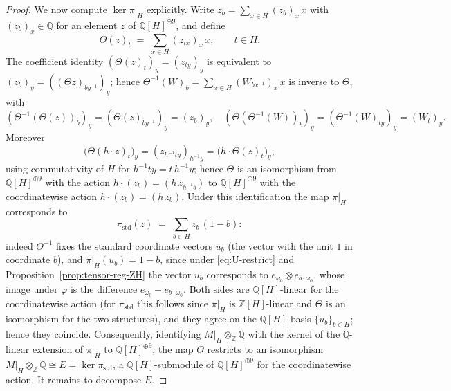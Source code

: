 \documentclass[12pt,a4paper]{article}
\theoremstyle{definition}
\begin{document}
\begin{proof}
We now compute \(\ker \pi|_H\) explicitly.  Write \(z_b = \sum_{x \in H}
(z_b)_x\, x\) with \((z_b)_x \in \mathbb{Q}\) for an element \(z\) of
\(\mathbb{Q}[H]^{\oplus 9}\), and define
\[
\Theta(z)_t \;=\; \sum_{x \in H} (z_{t x})_x\, x , \qquad t \in H .
\]
The coefficient identity \((\Theta(z)_t)_y = (z_{t y})_y\) is
equivalent to \((z_b)_y = ((\Theta z)_{b y^{-1}})_y\); hence
\(\Theta^{-1}(W)_b = \sum_{x \in H} (W_{b x^{-1}})_x\, x\) is inverse
to \(\Theta\), with
\[
(\Theta^{-1}(\Theta(z))_b)_y = (\Theta(z)_{b y^{-1}})_y = (z_b)_y,
\quad
(\Theta(\Theta^{-1}(W))_t)_y = (\Theta^{-1}(W)_{t y})_y = (W_t)_y .
\]
Moreover
\[
\bigl(\Theta(h \cdot z)_t\bigr)_y = (z_{h^{-1} t y})_{h^{-1} y}
= \bigl(h \cdot \Theta(z)_t\bigr)_y ,
\]
using commutativity of \(H\) for \(h^{-1} t y = t\, h^{-1} y\); hence
\(\Theta\) is an isomorphism from \(\mathbb{Q}[H]^{\oplus 9}\) with the
action \(h \cdot (z_b) = (h\, z_{h^{-1} b})\) to
\(\mathbb{Q}[H]^{\oplus 9}\) with the coordinatewise action
\(h \cdot (z_b) = (h\, z_b)\).  Under this identification the map
\(\pi|_H\) corresponds to
\[
\pi_{\mathrm{std}}(z) \;=\; \sum_{b \in H} z_b\,(1 - b) :
\]
indeed \(\Theta^{-1}\) fixes the standard coordinate vectors \(u_b\)
(the vector with the unit \(1\) in coordinate \(b\)), and
\(\pi|_H(u_b) = 1 - b\), since under \eqref{eq:U-restrict} and
Proposition~\ref{prop:tensor-reg-ZH} the vector \(u_b\) corresponds to
\(e_{\omega_0} \otimes e_{b \cdot \omega_0}\), whose image under
\(\varphi\) is the difference \(e_{\omega_0} - e_{b \cdot \omega_0}\).
Both sides are \(\mathbb{Q}[H]\)-linear for the coordinatewise action
(for \(\pi_{\mathrm{std}}\) this follows since \(\pi|_H\) is
\(\mathbb{Z}[H]\)-linear and \(\Theta\) is an isomorphism for the two
structures), and they agree on the \(\mathbb{Q}[H]\)-basis
\(\{u_b\}_{b \in H}\); hence they coincide.  Consequently, identifying
\(M|_H \otimes_{\mathbb{Z}} \mathbb{Q}\) with the kernel of the
\(\mathbb{Q}\)-linear extension of \(\pi|_H\) to
\(\mathbb{Q}[H]^{\oplus 9}\), the map \(\Theta\) restricts to an
isomorphism \(M|_H \otimes_{\mathbb{Z}} \mathbb{Q} \cong E =
\ker \pi_{\mathrm{std}}\), a \(\mathbb{Q}[H]\)-submodule of
\(\mathbb{Q}[H]^{\oplus 9}\) for the coordinatewise action.  It
remains to decompose \(E\).


\end{proof}
\end{document}
